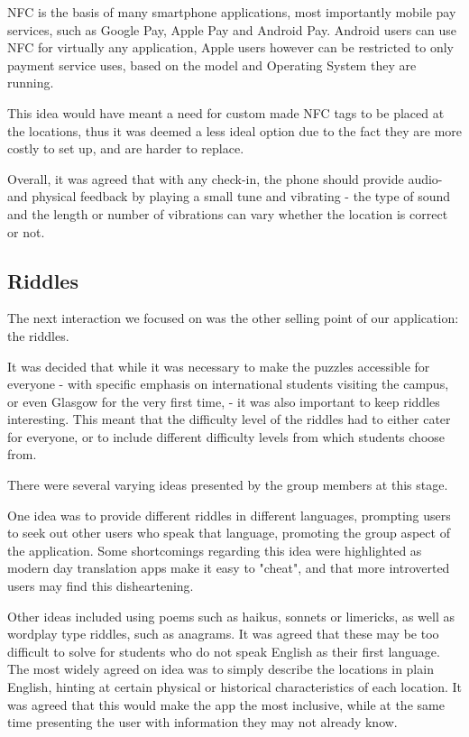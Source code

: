 \documentclass[10pt,twocolumn]{article} %
\begin{document}
NFC is the basis of many smartphone applications, most importantly mobile pay services, such as Google Pay, Apple Pay and Android Pay. Android users can use NFC for virtually any application, Apple users however can be restricted to only payment service uses, based on the model and Operating System they are running. 

This idea would have meant a need for custom made NFC tags to be placed at the locations, thus it was deemed a less ideal option due to the fact they are more costly to set up, and are harder to replace.

Overall, it was agreed that with any check-in, the phone should provide audio- and physical feedback by playing a small tune and vibrating - the type of sound and the length or number of vibrations can vary whether the location is correct or not.

\subsection*{Riddles}
The next interaction we focused on was the other selling point of our application: the riddles. 

It was decided that while it was necessary to make the puzzles accessible for everyone - with specific emphasis on international students visiting the campus, or even Glasgow for the very first time, - it was also important to keep riddles interesting.
This meant that the difficulty level of the riddles had to either cater for everyone, or to include different difficulty levels from which students choose from.

There were several varying ideas presented by the group members at this stage.

One idea was to provide different riddles in different languages, prompting users to seek out other users who speak that language, promoting the group aspect of the application. Some shortcomings regarding this idea were highlighted as modern day translation apps make it easy to "cheat", and that more introverted users may find this disheartening.

Other ideas included using poems such as haikus, sonnets or limericks, as well as wordplay type riddles, such as anagrams. It was agreed that these may be too difficult to solve for students who do not speak English as their first language.
The most widely agreed on idea was to simply describe the locations in plain English, hinting at certain physical or historical characteristics of each location. It was agreed that this would make the app the most inclusive, while at the same time presenting the user with information they may not already know.
\end{document}
